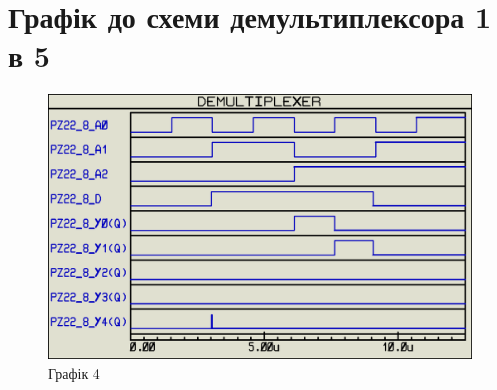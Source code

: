 \documentclass{article}
\begin{document}
\begin{normalsize}
\begin{figure}[H]
		\hspace{5px}
	\end{figure}	

	\section*{Графік до схеми демультиплексора 1 в 5}
	\begin{figure}[H]
		\centering
		\includegraphics[scale=0.34]{g4}	
		\caption{Графік 4}
	\end{figure}


\end{normalsize}
\end{document}
